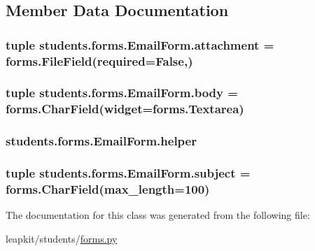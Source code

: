 \subsection{Member Data Documentation}
\hypertarget{classstudents_1_1forms_1_1_email_form_a665a24f8008c7bfaa174dd25decca0b0}{
\subsubsection[{attachment}]{\setlength{\rightskip}{0pt plus 5cm}tuple students.\-forms.\-Email\-Form.\-attachment = forms.\-File\-Field(required=False,)\hspace{0.3cm}{\ttfamily [static]}}}\label{classstudents_1_1forms_1_1_email_form_a665a24f8008c7bfaa174dd25decca0b0}
\hypertarget{classstudents_1_1forms_1_1_email_form_a8ef5a3b6972459707166e4b96b06d187}{
\subsubsection[{body}]{\setlength{\rightskip}{0pt plus 5cm}tuple students.\-forms.\-Email\-Form.\-body = forms.\-Char\-Field(widget=forms.\-Textarea)\hspace{0.3cm}{\ttfamily [static]}}}\label{classstudents_1_1forms_1_1_email_form_a8ef5a3b6972459707166e4b96b06d187}
\hypertarget{classstudents_1_1forms_1_1_email_form_a23d2d15aeb526e44e16a34f2a92a7ee6}{
\subsubsection[{helper}]{\setlength{\rightskip}{0pt plus 5cm}students.\-forms.\-Email\-Form.\-helper}}\label{classstudents_1_1forms_1_1_email_form_a23d2d15aeb526e44e16a34f2a92a7ee6}
\hypertarget{classstudents_1_1forms_1_1_email_form_a7bd89f273fdaea098b00a967c3594262}{
\subsubsection[{subject}]{\setlength{\rightskip}{0pt plus 5cm}tuple students.\-forms.\-Email\-Form.\-subject = forms.\-Char\-Field(max\-\_\-length=100)\hspace{0.3cm}{\ttfamily [static]}}}\label{classstudents_1_1forms_1_1_email_form_a7bd89f273fdaea098b00a967c3594262}


The documentation for this class was generated from the following file\-:\begin{DoxyCompactItemize}
\item 
leapkit/students/\hyperlink{forms_8py}{forms.\-py}\end{DoxyCompactItemize}
